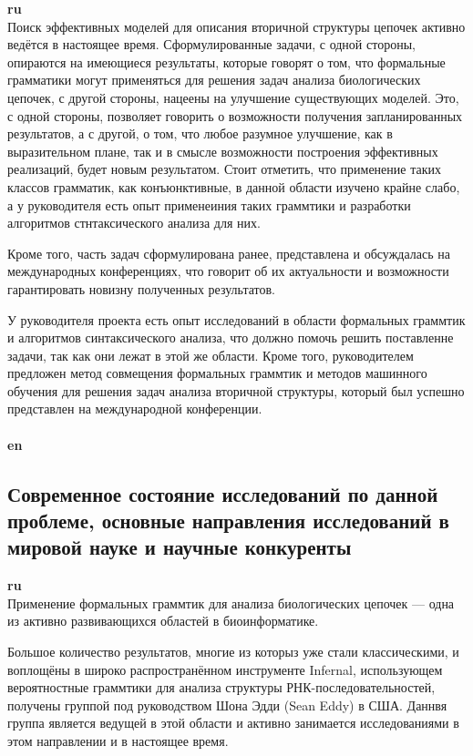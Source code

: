 ﻿\documentclass[12pt]{article}  %
\theoremstyle{remark}
\begin{document}
\textbf{ru}\\
Поиск эффективных моделей для описания вторичной структуры цепочек активно ведётся в настоящее время.
Сформулированные задачи, с одной стороны, опираются на имеющиеся результаты, которые говорят о том, что формальные грамматики могут применяться для решения задач анализа биологических цепочек, с другой стороны, нацеены на улучшение существующих моделей.
Это, с одной стороны, позволяет говорить о возможности получения запланированных результатов, а с другой, о том, что любое разумное улучшение, как в выразительном плане, так и в смысле возможности построения эффективных реализаций, будет новым результатом.
Стоит отметить, что применение таких классов грамматик, как конъюнктивные, в данной области изучено крайне слабо, а у руководителя есть опыт применеиния таких граммтики и разработки алгоритмов стнтаксического анализа для них.

Кроме того, часть задач сформулирована ранее, представлена и обсуждалась на международных конференциях, что говорит об их актуальности и возможности гарантировать новизну полученных результатов.

У руководителя проекта есть опыт исследований в области формальных граммтик и алгоритмов синтаксического анализа, что должно помочь решить поставленне задачи, так как они лежат в этой же области.
Кроме того, руководителем предложен метод совмещения формальных граммтик и методов машинного обучения для решения задач анализа вторичной структуры, который был успешно представлен на международной конференции.
\\
\\
\textbf{en}\\


\subsection{Современное состояние исследований по данной проблеме, основные направления исследований в мировой науке и научные конкуренты}

\textbf{ru}\\
Применение формальных граммтик для анализа биологических цепочек --- одна из активно развивающихся областей в биоинформатике.

Большое количество результатов, многие из которыз уже стали классическими, и воплощёны в широко распространённом инструменте Infernal, использующем вероятностные граммтики для анализа структуры РНК-последовательностей, получены группой под руководством Шона Эдди (Sean Eddy) в США.
Даннвя группа является ведущей в этой области и активно занимается исследованиями в этом направлении и в настоящее время.
\end{document}
